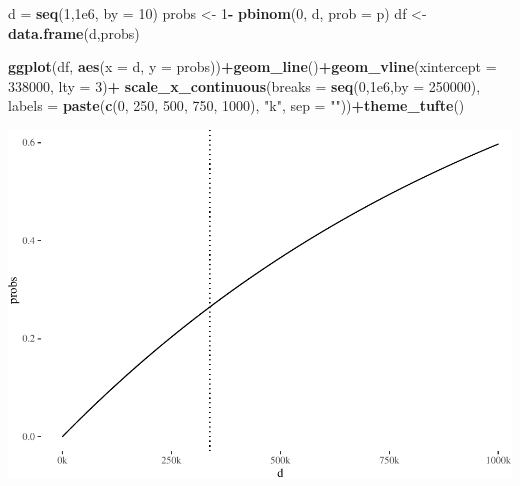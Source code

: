 \documentclass[10pt,dvipsnames,enabledeprecatedfontcommands]{scrartcl}
\newenvironment{Shaded}{\begin{snugshade}}{\end{snugshade}}
\newcommand{\KeywordTok}[1]{\textcolor[rgb]{0.13,0.29,0.53}{\textbf{#1}}}
\newcommand{\DataTypeTok}[1]{\textcolor[rgb]{0.13,0.29,0.53}{#1}}
\newcommand{\DecValTok}[1]{\textcolor[rgb]{0.00,0.00,0.81}{#1}}
\newcommand{\FloatTok}[1]{\textcolor[rgb]{0.00,0.00,0.81}{#1}}
\newcommand{\StringTok}[1]{\textcolor[rgb]{0.31,0.60,0.02}{#1}}
\newcommand{\OperatorTok}[1]{\textcolor[rgb]{0.81,0.36,0.00}{\textbf{#1}}}
\newcommand{\NormalTok}[1]{#1}
\begin{document}
\begin{Shaded}
\begin{Highlighting}[]
\NormalTok{d =}\StringTok{ }\KeywordTok{seq}\NormalTok{(}\DecValTok{1}\NormalTok{,}\FloatTok{1e6}\NormalTok{, }\DataTypeTok{by =} \DecValTok{10}\NormalTok{)}
\NormalTok{probs <-}\StringTok{ }\DecValTok{1}\OperatorTok{-}\StringTok{ }\KeywordTok{pbinom}\NormalTok{(}\DecValTok{0}\NormalTok{, d, }\DataTypeTok{prob =}\NormalTok{ p) }
\NormalTok{df <-}\StringTok{ }\KeywordTok{data.frame}\NormalTok{(d,probs)}

\KeywordTok{ggplot}\NormalTok{(df, }\KeywordTok{aes}\NormalTok{(}\DataTypeTok{x =}\NormalTok{ d, }\DataTypeTok{y =}\NormalTok{ probs))}\OperatorTok{+}\KeywordTok{geom_line}\NormalTok{()}\OperatorTok{+}\KeywordTok{geom_vline}\NormalTok{(}\DataTypeTok{xintercept =} \DecValTok{338000}\NormalTok{, }\DataTypeTok{lty =} \DecValTok{3}\NormalTok{)}\OperatorTok{+}
\StringTok{  }\KeywordTok{scale_x_continuous}\NormalTok{(}\DataTypeTok{breaks =} \KeywordTok{seq}\NormalTok{(}\DecValTok{0}\NormalTok{,}\FloatTok{1e6}\NormalTok{,}\DataTypeTok{by =} \DecValTok{250000}\NormalTok{), }\DataTypeTok{labels =} \KeywordTok{paste}\NormalTok{(}\KeywordTok{c}\NormalTok{(}\DecValTok{0}\NormalTok{, }\DecValTok{250}\NormalTok{, }\DecValTok{500}\NormalTok{, }\DecValTok{750}\NormalTok{, }\DecValTok{1000}\NormalTok{), }\StringTok{"k"}\NormalTok{, }\DataTypeTok{sep =} \StringTok{""}\NormalTok{))}\OperatorTok{+}\KeywordTok{theme_tufte}\NormalTok{()}
\end{Highlighting}
\end{Shaded}

\begin{center}\includegraphics[width=1\linewidth]{lr-chapter_files/figure-latex/unnamed-chunk-4-1} \end{center}
\end{document}
